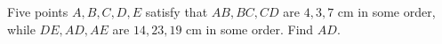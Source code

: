 Five points $A,B,C,D,E$ satisfy that $AB,BC,CD$ are $4,3,7$ cm in some order, while $DE,AD,AE$ are $14,23,19$ cm in some order. Find $AD$.
